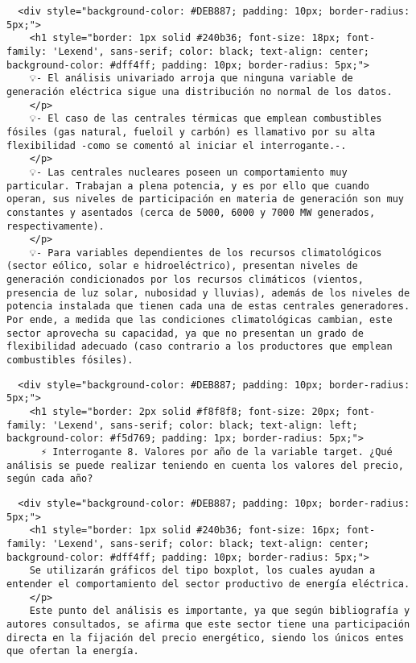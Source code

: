 \documentclass[11pt]{article}
\begin{document}
    \begin{verbatim}
  <div style="background-color: #DEB887; padding: 10px; border-radius: 5px;">
    <h1 style="border: 1px solid #240b36; font-size: 18px; font-family: 'Lexend', sans-serif; color: black; text-align: center; background-color: #dff4ff; padding: 10px; border-radius: 5px;">
    💡- El análisis univariado arroja que ninguna variable de generación eléctrica sigue una distribución no normal de los datos.
    </p>
    💡- El caso de las centrales térmicas que emplean combustibles fósiles (gas natural, fueloil y carbón) es llamativo por su alta flexibilidad -como se comentó al iniciar el interrogante.-.
    </p>
    💡- Las centrales nucleares poseen un comportamiento muy particular. Trabajan a plena potencia, y es por ello que cuando operan, sus niveles de participación en materia de generación son muy constantes y asentados (cerca de 5000, 6000 y 7000 MW generados, respectivamente).
    </p>
    💡- Para variables dependientes de los recursos climatológicos (sector eólico, solar e hidroeléctrico), presentan niveles de generación condicionados por los recursos climáticos (vientos, presencia de luz solar, nubosidad y lluvias), además de los niveles de potencia instalada que tienen cada una de estas centrales generadores. Por ende, a medida que las condiciones climatológicas cambian, este sector aprovecha su capacidad, ya que no presentan un grado de flexibilidad adecuado (caso contrario a los productores que emplean combustibles fósiles).
\end{verbatim}

    \begin{verbatim}
  <div style="background-color: #DEB887; padding: 10px; border-radius: 5px;">
    <h1 style="border: 2px solid #f8f8f8; font-size: 20px; font-family: 'Lexend', sans-serif; color: black; text-align: left; background-color: #f5d769; padding: 1px; border-radius: 5px;">
      ⚡ Interrogante 8. Valores por año de la variable target. ¿Qué análisis se puede realizar teniendo en cuenta los valores del precio, según cada año?
\end{verbatim}

    \begin{verbatim}
  <div style="background-color: #DEB887; padding: 10px; border-radius: 5px;">
    <h1 style="border: 1px solid #240b36; font-size: 16px; font-family: 'Lexend', sans-serif; color: black; text-align: center; background-color: #dff4ff; padding: 10px; border-radius: 5px;">
    Se utilizarán gráficos del tipo boxplot, los cuales ayudan a entender el comportamiento del sector productivo de energía eléctrica.
    </p>
    Este punto del análisis es importante, ya que según bibliografía y autores consultados, se afirma que este sector tiene una participación directa en la fijación del precio energético, siendo los únicos entes que ofertan la energía.
\end{verbatim}
\end{document}
